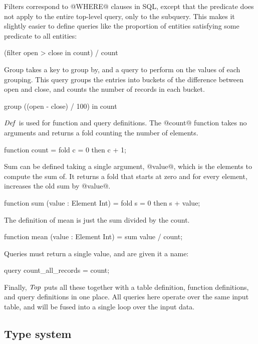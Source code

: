Filters correspond to @WHERE@ clauses in SQL, except that the predicate does not apply to the entire top-level query, only to the subquery.
This makes it slightly easier to define queries like the proportion of entities satisfying some predicate to all entities: 
\begin{code}
(filter open > close in count) / count
\end{code}

Group takes a key to group by, and a query to perform on the values of each grouping.
This query groups the entries into buckets of the difference between open and close, and counts the number of records in each bucket.
\begin{code}
group ((open - close) / 100) in count
\end{code}

$\mathit{Def}$ is used for function and query definitions.
The @count@ function takes no arguments and returns a fold counting the number of elements.
\begin{code}
function count
 = fold c = 0 then c + 1;
\end{code}

Sum can be defined taking a single argument, @value@, which is the elements to compute the sum of.
It returns a fold that starts at zero and for every element, increases the old sum by @value@.
\begin{code}
function sum (value : Element Int)
 = fold s = 0 then s + value;
\end{code}

The definition of mean is just the sum divided by the count.
\begin{code}
function mean (value : Element Int)
 = sum value / count;
\end{code}

Queries must return a single value, and are given it a name:
\begin{code}
query count_all_records = count;
\end{code}

Finally, $\mathit{Top}$ puts all these together with a table definition, function definitions, and query definitions in one place.
All queries here operate over the same input table, and will be fused into a single loop over the input data.




\subsection{Type system}

